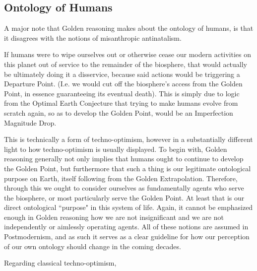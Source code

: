 \subsection{Ontology of Humans}

A major note that Golden reasoning makes about the ontology of humans, is that it disagrees with the notions of misanthropic antinatalism. 

\begin{prince}
    If humans were to wipe ourselves out or otherwise cease our modern activities on this planet out of service to the remainder of the biosphere, that would actually be ultimately doing it a disservice, because said actions would be triggering a Departure Point. (I.e. we would cut off the biosphere’s access from the Golden Point, in essence guaranteeing its eventual death). This is simply due to logic from the Optimal Earth Conjecture \cite{Nexus} that trying to make humans evolve from scratch again, so as to develop the Golden Point, would be an Imperfection Magnitude Drop. 
\end{prince}
This is technically a form of techno-optimism, however in a substantially different light to how techno-optimism is usually displayed. To begin with, Golden reasoning generally not only implies that humans ought to continue to develop the Golden Point, but furthermore that such a thing is our legitimate ontological purpose on Earth, itself following from the Golden Extrapolation. Therefore, through this we ought to consider ourselves as fundamentally agents who serve the biosphere, or most particularly serve the Golden Point. At least that is our direct ontological ``purpose" in this system of life. Again, it cannot be emphasized enough in Golden reasoning how we are not insignificant and we are not independently or aimlessly operating agents. All of these notions are assumed in Postmodernism, and as such it serves as a clear guideline for how our perception of our own ontology should change in the coming decades. 

Regarding classical techno-optimism, 
